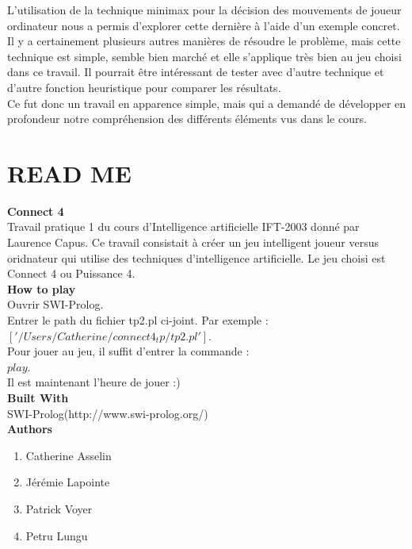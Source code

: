 \documentclass[12pt]{article}
\begin{document}
L’utilisation de la technique minimax pour la décision des mouvements de joueur ordinateur nous a permis d’explorer cette dernière à l’aide d’un exemple concret. Il y a certainement plusieurs autres manières de résoudre le problème, mais cette technique est simple, semble bien marché et elle s’applique très bien au jeu choisi dans ce travail. Il pourrait être intéressant de tester avec d’autre technique et d’autre fonction heuristique pour comparer les résultats.\\

Ce fut donc un travail en apparence simple, mais qui a demandé de développer en profondeur notre compréhension des différents éléments vus dans le cours. 

\newpage

\section{READ ME}
\textbf{Connect 4} \\

Travail pratique 1 du cours d'Intelligence artificielle IFT-2003 donné par Laurence Capus. 
Ce travail consistait à créer un jeu intelligent joueur versus oridnateur qui utilise des techniques 
d'intelligence artificielle. Le jeu choisi est Connect 4 ou Puissance 4. \\

\textbf{How to play} \\

Ouvrir SWI-Prolog. \\

Entrer le path du fichier tp2.pl ci-joint. Par exemple : \\

$['/Users/Catherine/connect4_tp/tp2.pl'].$ \\

Pour jouer au jeu, il suffit d'entrer la commande : \\

$play.$ \\

Il est maintenant l'heure de jouer :) \\

\textbf{Built With} \\

SWI-Prolog(http://www.swi-prolog.org/) \\

\textbf{Authors}
\begin{enumerate}
\item Catherine Asselin
\item Jérémie Lapointe
\item Patrick Voyer
\item Petru Lungu
\end{enumerate}
\end{document}

